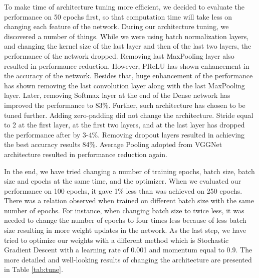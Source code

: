 \documentclass{IEEEtran}
\begin{document}
To make time of architecture tuning more efficient, we decided to evaluate the performance on 50 epochs first, so that computation time will take less on changing each feature of the network. During our architecture tuning, we discovered a number of things. While we were using batch normalization layers, and changing the kernel size of the last layer and then of the last two layers, the performance of the network dropped. Removing last MaxPooling layer also resulted in performance reduction. However, PReLU has shown enhancement in the accuracy of the network. Besides that, huge enhancement of the performance has shown removing the last convolution layer along with the last MaxPooling layer. Later, removing Softmax layer at the end of the Dense network has improved the performance to 83\%. Further, such architecture has chosen to be tuned further. Adding zero-padding did not change the architecture. Stride equal to 2 at the first layer, at the first two layers, and at the last layer has dropped the performance after by 3-4\%. Removing dropout layers resulted in achieving the best accuracy results 84\%. Average Pooling adopted from VGGNet architecture resulted in performance reduction again.

In the end, we have tried changing a number of training epochs, batch size, batch size and epochs at the same time, and the optimizer. When we evaluated our performance on 100 epochs, it gave 1\% less than was achieved on 250 epochs. There was a relation observed when trained on different batch size with the same number of epochs. For instance, when changing batch size to twice less, it was needed to change the number of epochs to four times less because of less batch size resulting in more weight updates in the network. As the last step, we have tried to optimize our weights with a different method which is Stochastic Gradient Descent with a learning rate of 0.001 and momentum equal to 0.9. The more detailed and well-looking results of changing the architecture are presented in Table \ref{tab:tune}.
\end{document}

